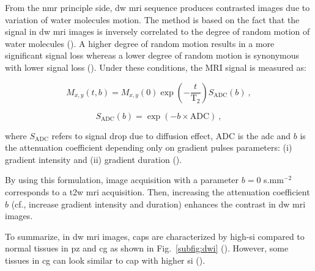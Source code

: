 \begin{enumerate}[leftmargin=*]
From the \ac{nmr} principle side, \ac{dw} \ac{mri} sequence produces contrasted images due to variation of water molecules motion. The method is based on the fact that the signal in \ac{dw} \ac{mri} images is inversely correlated to the degree of random motion of water molecules (\cite{Huisman2003}). %
A higher degree of random motion results in a more significant signal loss whereas a lower degree of random motion is synonymous with lower signal loss (\cite{Huisman2003}). Under these conditions, the MRI signal is measured as:

\begin{equation}
	M_{x,y}\left(t,b\right) = M_{x,y}(0) \exp \left( - \frac{t}{\text{T}_2} \right) S_{\text{ADC}}(b) \ , 
	\label{eq:t2dif}
\end{equation}

\begin{equation}
	S_{\text{ADC}}(b) = \exp \left( -b \times \text{ADC} \right) \ ,
	\label{eq:dif}
\end{equation}

\noindent where $S_{\text{ADC}}$ refers to signal drop due to diffusion effect, $\text{ADC}$ is the \acl{adc} and $b$ is the attenuation coefficient depending only on gradient pulses parameters: (i) gradient intensity and (ii) gradient duration (\cite{LeBihan1986}).

By using this formulation, image acquisition with a parameter $b=0$ s.mm$^{-2}$ corresponds to a \ac{t2w} \ac{mri} acquisition. Then, increasing the attenuation coefficient $b$ (cf., increase gradient intensity and duration) enhances the contrast in \ac{dw} \ac{mri} images.

To summarize, in \ac{dw} \ac{mri} images, \acp{cap} are characterized by high-\ac{si} compared to normal tissues in \ac{pz} and \ac{cg} as shown in Fig.~\ref{subfig:dwi} (\cite{Barentsz2012}). However, some tissues in \ac{cg} can look similar to \ac{cap} with higher \ac{si} (\cite{Barentsz2012}).


\end{enumerate}
